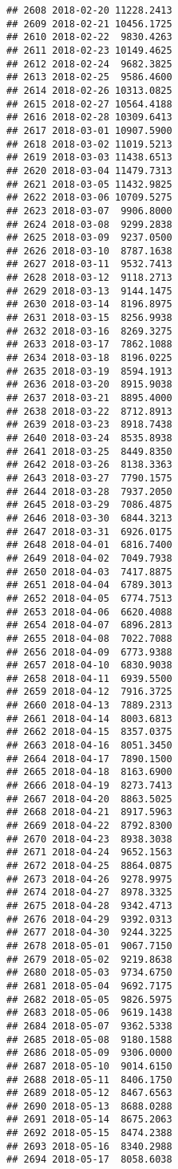 \documentclass[
]{article}
\begin{document}
\begin{verbatim}
## 2608 2018-02-20 11228.2413
## 2609 2018-02-21 10456.1725
## 2610 2018-02-22  9830.4263
## 2611 2018-02-23 10149.4625
## 2612 2018-02-24  9682.3825
## 2613 2018-02-25  9586.4600
## 2614 2018-02-26 10313.0825
## 2615 2018-02-27 10564.4188
## 2616 2018-02-28 10309.6413
## 2617 2018-03-01 10907.5900
## 2618 2018-03-02 11019.5213
## 2619 2018-03-03 11438.6513
## 2620 2018-03-04 11479.7313
## 2621 2018-03-05 11432.9825
## 2622 2018-03-06 10709.5275
## 2623 2018-03-07  9906.8000
## 2624 2018-03-08  9299.2838
## 2625 2018-03-09  9237.0500
## 2626 2018-03-10  8787.1638
## 2627 2018-03-11  9532.7413
## 2628 2018-03-12  9118.2713
## 2629 2018-03-13  9144.1475
## 2630 2018-03-14  8196.8975
## 2631 2018-03-15  8256.9938
## 2632 2018-03-16  8269.3275
## 2633 2018-03-17  7862.1088
## 2634 2018-03-18  8196.0225
## 2635 2018-03-19  8594.1913
## 2636 2018-03-20  8915.9038
## 2637 2018-03-21  8895.4000
## 2638 2018-03-22  8712.8913
## 2639 2018-03-23  8918.7438
## 2640 2018-03-24  8535.8938
## 2641 2018-03-25  8449.8350
## 2642 2018-03-26  8138.3363
## 2643 2018-03-27  7790.1575
## 2644 2018-03-28  7937.2050
## 2645 2018-03-29  7086.4875
## 2646 2018-03-30  6844.3213
## 2647 2018-03-31  6926.0175
## 2648 2018-04-01  6816.7400
## 2649 2018-04-02  7049.7938
## 2650 2018-04-03  7417.8875
## 2651 2018-04-04  6789.3013
## 2652 2018-04-05  6774.7513
## 2653 2018-04-06  6620.4088
## 2654 2018-04-07  6896.2813
## 2655 2018-04-08  7022.7088
## 2656 2018-04-09  6773.9388
## 2657 2018-04-10  6830.9038
## 2658 2018-04-11  6939.5500
## 2659 2018-04-12  7916.3725
## 2660 2018-04-13  7889.2313
## 2661 2018-04-14  8003.6813
## 2662 2018-04-15  8357.0375
## 2663 2018-04-16  8051.3450
## 2664 2018-04-17  7890.1500
## 2665 2018-04-18  8163.6900
## 2666 2018-04-19  8273.7413
## 2667 2018-04-20  8863.5025
## 2668 2018-04-21  8917.5963
## 2669 2018-04-22  8792.8300
## 2670 2018-04-23  8938.3038
## 2671 2018-04-24  9652.1563
## 2672 2018-04-25  8864.0875
## 2673 2018-04-26  9278.9975
## 2674 2018-04-27  8978.3325
## 2675 2018-04-28  9342.4713
## 2676 2018-04-29  9392.0313
## 2677 2018-04-30  9244.3225
## 2678 2018-05-01  9067.7150
## 2679 2018-05-02  9219.8638
## 2680 2018-05-03  9734.6750
## 2681 2018-05-04  9692.7175
## 2682 2018-05-05  9826.5975
## 2683 2018-05-06  9619.1438
## 2684 2018-05-07  9362.5338
## 2685 2018-05-08  9180.1588
## 2686 2018-05-09  9306.0000
## 2687 2018-05-10  9014.6150
## 2688 2018-05-11  8406.1750
## 2689 2018-05-12  8467.6563
## 2690 2018-05-13  8688.0288
## 2691 2018-05-14  8675.2063
## 2692 2018-05-15  8474.2388
## 2693 2018-05-16  8340.2988
## 2694 2018-05-17  8058.6038

\end{verbatim}
\end{document}
